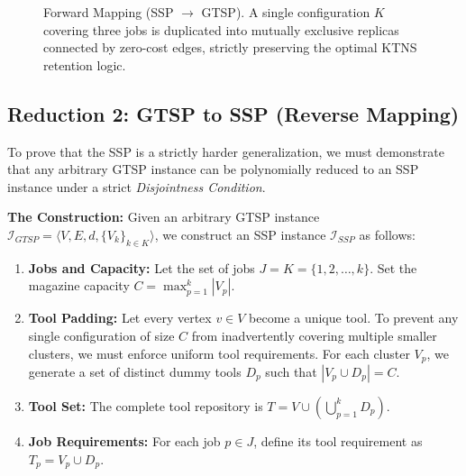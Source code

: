 \documentclass[12pt]{article}
\begin{document}
\begin{figure}[h!]
	\caption{Forward Mapping (SSP $\rightarrow$ GTSP). A single configuration $K$ covering three jobs is duplicated into mutually exclusive replicas connected by zero-cost edges, strictly preserving the optimal KTNS retention logic.}
	\label{fig:forward_mapping}
\end{figure}

\subsection{Reduction 2: GTSP to SSP (Reverse Mapping)}

To prove that the SSP is a strictly harder generalization, we must demonstrate that any arbitrary GTSP instance can be polynomially reduced to an SSP instance under a strict \textit{Disjointness Condition}. 

\textbf{The Construction:} Given an arbitrary GTSP instance $\mathcal{I}_{GTSP} = \langle V, E, d, \{V_k\}_{k \in K} \rangle$, we construct an SSP instance $\mathcal{I}_{SSP}$ as follows:
\begin{enumerate}
	\item \textbf{Jobs and Capacity:} Let the set of jobs $J = K = \{1, 2, \dots, k\}$. Set the magazine capacity $C = \max_{p=1}^k |V_p|$.
	\item \textbf{Tool Padding:} Let every vertex $v \in V$ become a unique tool. To prevent any single configuration of size $C$ from inadvertently covering multiple smaller clusters, we must enforce uniform tool requirements. For each cluster $V_p$, we generate a set of distinct dummy tools $D_p$ such that $|V_p \cup D_p| = C$. 
	\item \textbf{Tool Set:} The complete tool repository is $T = V \cup (\bigcup_{p=1}^k D_p)$.
	\item \textbf{Job Requirements:} For each job $p \in J$, define its tool requirement as $T_p = V_p \cup D_p$.
\end{enumerate}
\end{document}
